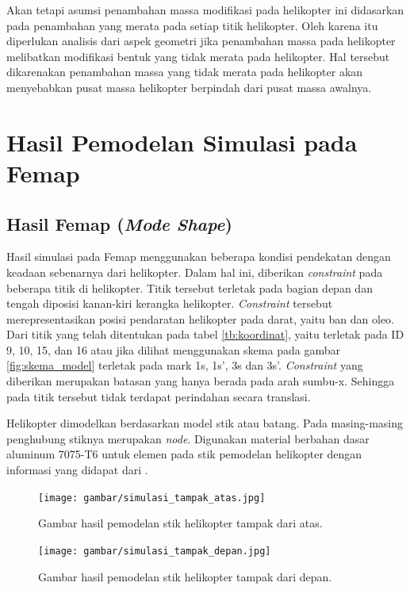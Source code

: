 Akan tetapi asumsi penambahan massa modifikasi pada helikopter ini didasarkan pada penambahan yang merata pada setiap titik helikopter. Oleh karena itu diperlukan analisis dari aspek geometri jika penambahan massa pada helikopter melibatkan modifikasi bentuk yang tidak merata pada helikopter. Hal tersebut dikarenakan penambahan massa yang tidak merata pada helikopter akan menyebabkan pusat massa helikopter berpindah dari pusat massa awalnya. 


\section{Hasil Pemodelan Simulasi pada Femap}

\subsection{Hasil Femap (\textit{Mode Shape})}

Hasil simulasi pada Femap menggunakan beberapa kondisi pendekatan dengan keadaan sebenarnya dari helikopter. Dalam hal ini, diberikan \textit{constraint} pada beberapa titik di helikopter. Titik tersebut terletak pada bagian depan dan tengah diposisi kanan-kiri kerangka helikopter. \textit{Constraint} tersebut merepresentasikan posisi pendaratan helikopter pada darat, yaitu ban dan oleo. Dari titik yang telah ditentukan pada tabel \ref{tb:koordinat}, yaitu terletak pada ID 9, 10, 15, dan 16 atau jika dilihat menggunakan skema pada gambar \ref{fig:skema_model} terletak pada mark 1s, 1s', 3s dan 3s'. \textit{Constraint} yang diberikan merupakan batasan yang hanya berada pada arah sumbu-x. Sehingga pada titik tersebut tidak terdapat perindahan secara translasi.

Helikopter dimodelkan berdasarkan model stik atau batang. Pada masing-masing penghubung stiknya merupakan \textit{node}. Digunakan material berbahan dasar aluminum 7075-T6 untuk elemen pada stik pemodelan helikopter dengan informasi yang didapat dari \cite{ASTM}.

\begin{figure}[H]
	\centering
	\texttt{[image: gambar/simulasi\_tampak\_atas.jpg]}
	\caption{Gambar hasil pemodelan stik helikopter tampak dari atas.}
	\label{fig:simulasi_tampak_atas}
\end{figure}

\begin{figure}[H]
	\centering
	\texttt{[image: gambar/simulasi\_tampak\_depan.jpg]}
	\caption{Gambar hasil pemodelan stik helikopter tampak dari depan.}
	\label{fig:simulasi_tampak_depan}
\end{figure}

